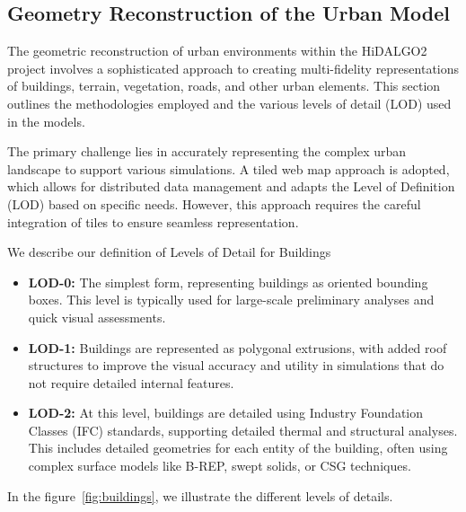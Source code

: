 \documentclass[runningheads]{llncs}
\begin{document}
\subsection{Geometry Reconstruction of the Urban Model}

The geometric reconstruction of urban environments within the HiDALGO2 project involves a sophisticated approach to creating multi-fidelity representations of buildings, terrain, vegetation, roads, and other urban elements. This section outlines the methodologies employed and the various levels of detail (LOD) used in the models.

The primary challenge lies in accurately representing the complex urban landscape to support various simulations. A tiled web map approach is adopted, which allows for distributed data management and adapts the Level of Definition (LOD) based on specific needs. However, this approach requires the careful integration of tiles to ensure seamless representation.

We describe our definition of Levels of Detail for Buildings
\begin{itemize}
    \item \textbf{LOD-0:} The simplest form, representing buildings as oriented bounding boxes. This level is typically used for large-scale preliminary analyses and quick visual assessments.
    \item \textbf{LOD-1:} Buildings are represented as polygonal extrusions, with added roof structures to improve the visual accuracy and utility in simulations that do not require detailed internal features.
    \item \textbf{LOD-2:} At this level, buildings are detailed using Industry Foundation Classes (IFC) standards, supporting detailed thermal and structural analyses. This includes detailed geometries for each entity of the building, often using complex surface models like B-REP, swept solids, or CSG techniques.
\end{itemize}


In the figure~\ref{fig:buildings}, we illustrate the different levels of details.
\end{document}
